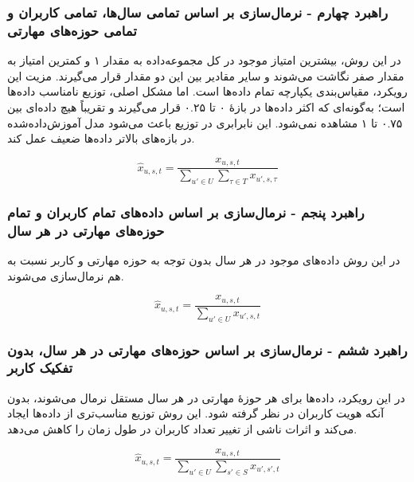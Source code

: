 \subsubsection*{راهبرد چهارم - نرمال‌سازی بر اساس تمامی سال‌ها، تمامی کاربران و تمامی حوزه‌های مهارتی}
در این روش، بیشترین امتیاز موجود در کل مجموعه‌داده به مقدار ۱ و کمترین امتیاز به مقدار صفر نگاشت می‌شوند و سایر مقادیر بین این دو مقدار قرار می‌گیرند. مزیت این رویکرد، مقیاس‌بندی یکپارچه تمام داده‌ها است. اما مشکل اصلی، توزیع نامناسب داده‌ها است؛ به‌گونه‌ای که اکثر داده‌ها در بازهٔ ۰ تا ۰.۲۵ قرار می‌گیرند و تقریباً هیچ داده‌ای بین ۰.۷۵ تا ۱ مشاهده نمی‌شود. این نابرابری در توزیع باعث می‌شود مدل آموزش‌داده‌شده در بازه‌های بالاتر داده‌ها ضعیف عمل کند.

\begin{equation}
\hat{x}_{u,s,t} = \frac{x_{u,s,t}}{\sum_{u' \in U}\sum_{\tau \in T} x_{u',s,\tau}}
\end{equation}

   \subsubsection*{راهبرد پنجم - نرمال‌سازی بر اساس داده‌های تمام کاربران و تمام حوزه‌های مهارتی در هر سال}
   در این روش داده‌های موجود در هر سال بدون توجه به حوزه مهارتی و کاربر نسبت به هم نرمال‌سازی می‌شوند.

\begin{equation}
\hat{x}_{u,s,t} = \frac{x_{u,s,t}}{\sum_{u' \in U} x_{u',s,t}}
\end{equation}   



   \subsubsection*{راهبرد ششم - نرمال‌سازی بر اساس حوزه‌های مهارتی در هر سال، بدون تفکیک کاربر}
در این رویکرد، داده‌ها برای هر حوزهٔ مهارتی در هر سال مستقل نرمال می‌شوند، بدون آنکه هویت کاربران در نظر گرفته شود. این روش توزیع مناسب‌تری از داده‌ها ایجاد می‌کند و اثرات ناشی از تغییر تعداد کاربران در طول زمان را کاهش می‌دهد.

\begin{equation}
\hat{x}_{u,s,t} = \frac{x_{u,s,t}}{\sum_{u' \in U}\sum_{s' \in S} x_{u',s',t}}
\end{equation}




